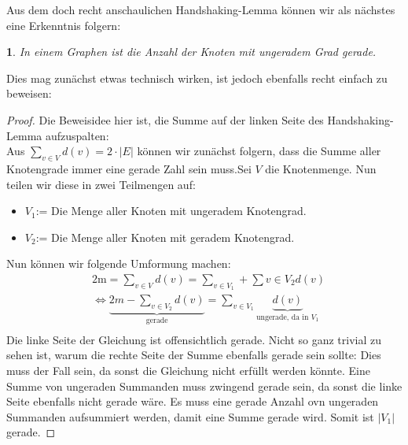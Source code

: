 \documentclass{article}
\theoremstyle{plain}
\newcommand{\thistheoremname}{}
\newtheorem{genericthm}[theorem]{\thistheoremname}
\newenvironment{namedthm}[1]
  {\renewcommand{\thistheoremname}{#1}
   \begin{genericthm}}
  {\end{genericthm}}
\begin{document}
\newpage
Aus dem doch recht anschaulichen Handshaking-Lemma können wir als nächstes eine Erkenntnis folgern:\\
\begin{namedthm}{Lemma}
	In einem Graphen ist die Anzahl der Knoten mit \emph{ungeradem Grad} gerade.\cite[S.~6]{bue_1}
\end{namedthm}
\bigskip
Dies mag zunächst etwas technisch wirken, ist jedoch ebenfalls recht einfach zu beweisen:
\begin{proof}
	Die Beweisidee hier ist, die Summe auf der linken Seite des Handshaking-Lemma aufzuspalten:\\
	Aus $\sum_{v \in V}d(v) = 2 \cdot |E|$ können wir zunächst folgern, dass die Summe aller Knotengrade immer eine gerade Zahl sein muss.Sei $V$ die Knotenmenge. Nun teilen wir diese in zwei Teilmengen auf:
		\begin{itemize}
			\item{$V_1$:= Die Menge aller Knoten mit ungeradem Knotengrad.}
			\item{$V_2$:= Die Menge aller Knoten mit geradem Knotengrad.}
		\end{itemize}
	Nun können wir folgende Umformung machen:
		\begin{align*}
			&2\text{m} = \sum_{v \in V}d(v) = \sum_{v \in V_1} + \sum{v \in V_2}d(v)\\
			&\Leftrightarrow \underbrace{2m - \sum_{v \in V_2}d(v)}_{\text{gerade}} = \sum_{v \in V_1}\underbrace{d(v)}_{\text{ungerade, da in $V_1$}}\\
		\end{align*}
	Die linke Seite der Gleichung ist offensichtlich gerade. Nicht so ganz trivial zu sehen ist, warum die rechte Seite der Summe ebenfalls gerade sein sollte: Dies muss der Fall sein, da sonst die Gleichung nicht erfüllt werden könnte. Eine Summe von ungeraden Summanden muss zwingend gerade sein, da sonst die linke Seite ebenfalls nicht gerade wäre. Es muss eine gerade Anzahl ovn ungeraden Summanden aufsummiert werden, damit eine Summe gerade wird. Somit ist $|V_1|$ gerade.\cite[S.~6]{bue_1}
\end{proof}
\newpage
\end{document}
